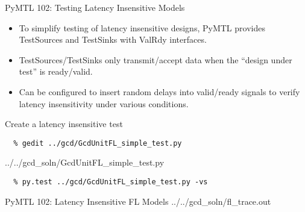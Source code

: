 \begin{frame}{PyMTL 102: Testing Latency Insensitive Models}

\begin{itemize}
  \item To simplify testing of latency insensitive designs, PyMTL provides
        TestSources and TestSinks with ValRdy interfaces.
  \smallskip
  \item TestSources/TestSinks only transmit/accept data when the ``design
        under test'' is ready/valid.
  \smallskip
  \item Can be configured to insert random delays into valid/ready signals
        to verify latency insensitivity under various conditions.
\end{itemize}

\end{frame}

\begin{task}\begin{frame}[fragile]{Create a latency insensitive test}
\vspace{-0.2in}
\begin{Verbatim}[commandchars=\\\{\}]
  % cd    \midtilde/pymtl-tut/build
  % gedit ../gcd/GcdUnitFL_simple_test.py
\end{Verbatim}

%
{../../gcd_soln/GcdUnitFL_simple_test.py}

\begin{verbatim}
  % py.test ../gcd/GcdUnitFL_simple_test.py -vs
\end{verbatim}
\end{frame}
\end{task}

\begin{frame}{PyMTL 102: Latency Insensitive FL Models}
\vspace{-0.25in}
%
{../../gcd_soln/fl_trace.out}

\end{frame}

